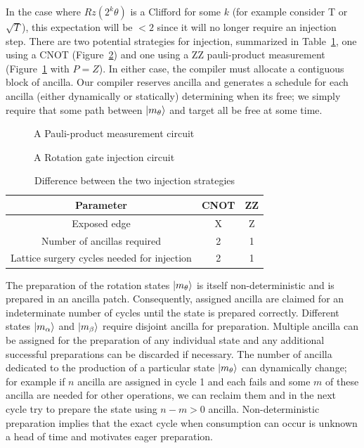 In the case where $Rz(2^k\theta)$ is a Clifford for some $k$ (for example consider T or $\sqrt{T}$), this expectation will be $< 2$ since it will no longer require an injection step. There are two potential strategies for injection, summarized in Table~\ref{table:LvsZZ}, one using a CNOT (Figure~\ref{fig:rzrotation}) and one using a ZZ pauli-product measurement (Figure~\ref{fig:pauliprod} with $P = Z$). In either case, the compiler must allocate a contiguous block of ancilla. Our compiler reserves ancilla and generates a schedule for each ancilla (either dynamically or statically) determining when its free; we simply require that some path between $\ket{m_\theta}$ and target all be free at some time.

\begin{figure}
    \centering
    
    \caption{A Pauli-product measurement circuit}
    \label{fig:pauliprod}
\end{figure}
\begin{figure}
    \centering
    
    \caption{A Rotation gate injection circuit}
    \label{fig:rzrotation}
\end{figure}
\begin{table}
    \centering
    \begin{tabular}{|c|c|c|}
        \hline
        Parameter & CNOT & ZZ \\
        \hline
        Exposed edge & X & Z \\
        Number of ancillas required & 2 & 1 \\
        Lattice surgery cycles needed for injection & 2 & 1 \\ %
        \hline
    \end{tabular}
    \caption{Difference between the two injection strategies}
    \label{table:LvsZZ}
\end{table}
The preparation of the rotation states $\ket{m_\theta}$ is itself non-deterministic and is prepared in an ancilla patch. Consequently, assigned ancilla are claimed for an indeterminate number of cycles until the state is prepared correctly. Different states $\ket{m_\alpha}$ and $\ket{m_\beta}$ require disjoint ancilla for preparation. Multiple ancilla can be assigned for the preparation of any individual state and any additional successful preparations can be discarded if necessary. The number of ancilla dedicated to the production of a particular state $\ket{m_\theta}$ can dynamically change; for example if $n$ ancilla are assigned in cycle 1 and each fails and some $m$ of these ancilla are needed for other operations, we can reclaim them and in the next cycle try to prepare the state using $n - m > 0$ ancilla. Non-deterministic preparation implies that the exact cycle when consumption can occur is unknown a head of time and motivates eager preparation.

